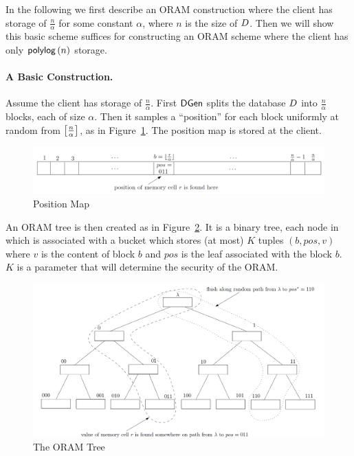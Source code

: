 In the following we first describe an ORAM construction where the client has storage of $\frac{n}{\alpha}$ for some constant $\alpha$, where $n$ is the size of $D$. Then we will show this basic scheme suffices for constructing an ORAM scheme where the client has only ${\sf polylog}\left(n\right)$ storage.

\paragraph{A Basic Construction.}
Assume the client has storage of $\frac{n}{\alpha}$. First $\mathsf{DGen}$ splits the database $D$ into $\frac{n}{\alpha}$ blocks, each of size $\alpha$. Then it samples a ``position'' for each block uniformly at random from $\left[\frac{n}{\alpha}\right]$, as in Figure~\ref{fig:position_map}. The position map is stored at the client.
\begin{figure}[h]
    \centering
    \includegraphics[scale = 0.48]{position_map.png}
    \caption{Position Map}
    \label{fig:position_map}
\end{figure}

An ORAM tree is then created as in Figure~\ref{fig:ORAM_tree}. It is a binary tree, each node in which is associated with a bucket which stores (at most) $K$ tuples $(b, pos, v)$ where $v$ is the content of block $b$ and $pos$ is the leaf associated with the block $b$. $K$ is a parameter that will determine the security of the ORAM.
\begin{figure}[h]
    \centering
    \includegraphics[scale = 0.5]{ORAM_tree.png}
    \caption{The ORAM Tree}
    \label{fig:ORAM_tree}
\end{figure}

